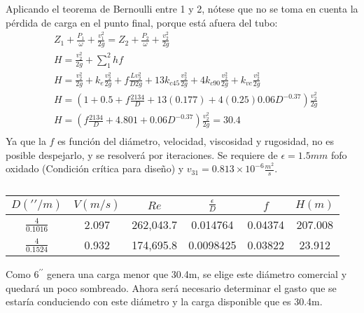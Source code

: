 Aplicando el teorema de Bernoulli entre 1 y 2, nótese que no se toma en cuenta la pérdida de carga en el punto final, porque está afuera del tubo:
\begin{align*}
    &Z_1 + \frac{P_1}{\omega} + \frac{v_1^2}{2g} = Z_2 + \frac{P_2}{\omega} + \frac{v_2^2}{2g}\\
    &H = \frac{v_2^2}{2g} + \sum_1^2 hf\\
    &H = \frac{v_2^2}{2g} + k_e\frac{v_2^2}{2g} + f\frac{L v_2^2}{D2g} + 13k_{c 45}\frac{v_2^2}{2g} + 4k_{c 90}\frac{v_2^2}{2g} + k_{vc}\frac{v_2^2}{2g}\\
    &H =\left(1 + 0.5 +f\frac{2134}{D} +13 (0.177) + 4(0.25) 0.06D^{ -0.37} \right) \frac{v_2^2}{2g}\\
    &H =\left(f\frac{2134}{D} + 4.801 + 0.06D^{ -0.37} \right) \frac{v_2^2}{2g} = 30.4 \\
\end{align*}
Ya que la $f$ es función del diámetro, velocidad, viscosidad y rugosidad, no es posible despejarlo, y se resolverá por iteraciones. Se requiere de $\epsilon=1.5mm$ fofo oxidado (Condición crítica para diseño) y $v_{31}=0.813\times 10^{-6} \frac{m^2}{s}$.
\begin{table}[h!]
    \centering
    \begin{tabular}{@{}cccccc@{}}
    \toprule
    $D(\prime\prime/m)$ & $V(m/s)$ & $Re$      & $\frac{\epsilon}{D}$ & $f$     & $H(m)$  \\ \midrule
    $\frac{4}{0.1016}$  & 2.097    & 262,043.7 & 0.014764             & 0.04374 & 207.008 \\
    $\frac{4}{0.1524}$  & 0.932    & 174,695.8 & 0.0098425            & 0.03822 & 23.912  \\ \bottomrule
    \end{tabular}
    \caption{}
    \label{tabhb30}
\end{table}
Como $6^{\prime\prime}$ genera una carga menor que 30.4m, se elige este diámetro comercial y quedará un poco sombreado. Ahora será necesario determinar el gasto que se estaría conduciendo con este diámetro y la carga disponible que es 30.4m.

